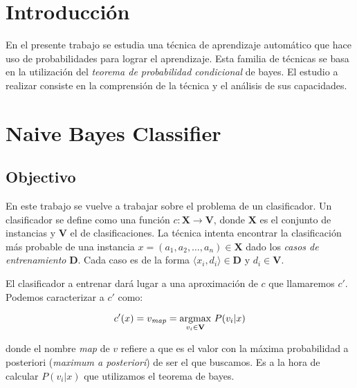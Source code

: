 \documentclass[a4paper,10pt]{article}
\begin{document}



\maketitle
\tableofcontents
\newpage

\section{Introducción}

En el presente trabajo se estudia una técnica de aprendizaje automático que hace uso de probabilidades para lograr el aprendizaje. Esta familia de técnicas se basa en la utilización del \emph{teorema de probabilidad condicional} de bayes. El estudio a realizar consiste en la comprensión de la técnica y el análisis de sus capacidades.

\section{Naive Bayes Classifier}

\subsection{Objectivo}

En este trabajo se vuelve a trabajar sobre el problema de un clasificador. Un clasificador se define como una función $c : \mathbf{X} \rightarrow \mathbf{V}$, donde $\mathbf{X}$ es el conjunto de instancias y $\mathbf{V}$ el de clasificaciones. La técnica intenta encontrar la clasificación más probable de una instancia $x = (a_1, a_2, \dots, a_n) \in \mathbf{X}$ dado los \emph{casos de entrenamiento} $\mathbf{D}$. Cada caso es de la forma $\langle x_i, d_i \rangle \in \mathbf{D}$ y $d_i \in \mathbf{V}$.

El clasificador a entrenar dará lugar a una aproximación de $c$ que llamaremos $c'$. Podemos caracterizar a $c'$ como: 

$$ c'(x) = v_{\text{\emph{map}}} = \underset{v_i \in \mathbf{V}}{\text{argmax}}\  P(v_i | x) $$

donde el nombre \emph{map} de $v$ refiere a que es el valor con la máxima probabilidad a posteriori (\emph{maximum a posteriori}) de ser el que buscamos. Es a la hora de calcular $P(v_i | x)$ que utilizamos el teorema de bayes.
\end{document}
